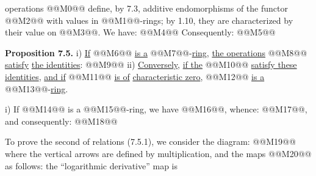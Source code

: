 operations @@M0@@ define, by 7.3, additive endomorphisms of the functor @@M2@@ with values in @@M1@@-rings; by 1.10, they are characterized by their value on @@M3@@. We have:
@@M4@@
Consequently:
@@M5@@

\textbf{Proposition 7.5.} i) \uline{If} @@M6@@ \uline{is a} @@M7@@-\uline{ring}, \uline{the operations} @@M8@@ \uline{satisfy} \uline{the identities}:
@@M9@@
ii) \uline{Conversely}, \uline{if the} @@M10@@ \uline{satisfy these identities}, \uline{and if} @@M11@@ \uline{is of} \uline{characteristic zero}, @@M12@@ \uline{is a} @@M13@@-\uline{ring}.

i) If @@M14@@ is a @@M15@@-ring, we have @@M16@@, whence: @@M17@@, and consequently:
@@M18@@

To prove the second of relations (7.5.1), we consider the diagram:
@@M19@@
where the vertical arrows are defined by multiplication, and the maps @@M20@@ as follows: the ``logarithmic derivative'' map is
